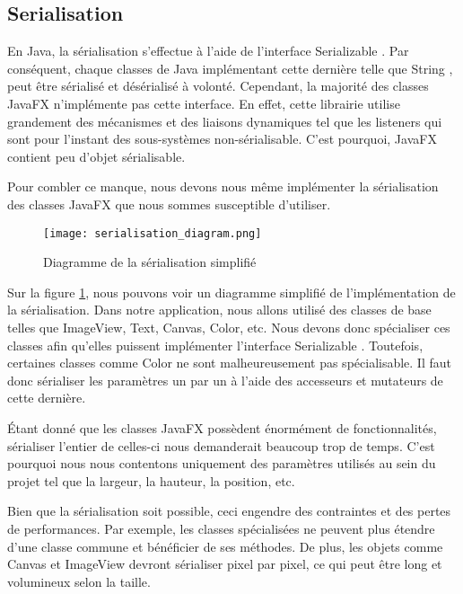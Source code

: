 \subsection{Serialisation}
\label{sec:serialisation}
En Java, la sérialisation s'effectue à l'aide de l'interface \og Serializable \fg{}. Par conséquent, chaque classes de Java implémentant cette dernière telle que \og String \fg{}, peut être sérialisé et désérialisé à volonté. Cependant, la majorité des classes JavaFX n'implémente pas cette interface. En effet, cette librairie utilise grandement des mécanismes et des liaisons dynamiques tel que les listeners qui sont pour l'instant des sous-systèmes non-sérialisable. C'est pourquoi, JavaFX contient peu d'objet sérialisable.

Pour combler ce manque, nous devons nous même implémenter la sérialisation des classes JavaFX que nous sommes susceptible d'utiliser.

\begin{figure}[h]
    \caption{Diagramme de la sérialisation simplifié}
    \centering
    \texttt{[image: serialisation\_diagram.png]}
    \label{fig:seri_diag}
\end{figure}

Sur la figure \ref{fig:seri_diag}, nous pouvons voir un diagramme simplifié de l'implémentation de la sérialisation. Dans notre application, nous allons utilisé des classes de base telles que ImageView, Text, Canvas, Color, etc. Nous devons donc spécialiser ces classes afin qu'elles puissent implémenter l'interface \og Serializable \fg{}. Toutefois, certaines classes comme \og Color \fg{} ne sont malheureusement pas spécialisable. Il faut donc sérialiser les paramètres un par un à l'aide des accesseurs et mutateurs de cette dernière.

Étant donné que les classes JavaFX possèdent énormément de fonctionnalités, sérialiser l'entier de celles-ci nous demanderait beaucoup trop de temps. C'est pourquoi nous nous contentons uniquement des paramètres utilisés au sein du projet tel que la largeur, la hauteur, la position, etc.



Bien que la sérialisation soit possible, ceci engendre des contraintes et des pertes de performances. Par exemple, les classes spécialisées ne peuvent plus étendre d'une classe commune et bénéficier de ses méthodes. De plus, les objets comme Canvas et ImageView devront sérialiser pixel par pixel, ce qui peut être long et volumineux selon la taille.

